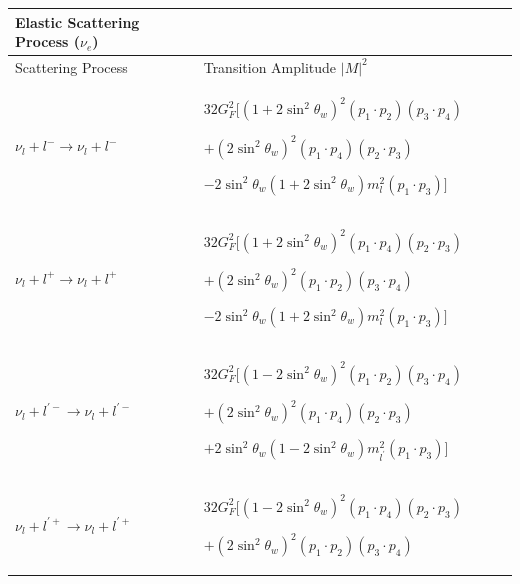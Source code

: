 \begin{table}[h]
\centering
\begin{tabular}{lp{8cm}lp{8cm}l}
\hline\hline
Elastic Scattering Process ($\nu_e$) \\
\hline\hline
Scattering Process & Transition Amplitude $|M|^2$\\
\hline
$\nu_l+l^-\longrightarrow\nu_l+l^-$ & 
$ 32G^2_F\bigg[
   \left(1+2\sin^2\theta_w\right)^2\left(p_1\cdot p_2\right)\left(p_3\cdot p_4\right)$
   
   $+\left(2\sin^2\theta_w\right)^2\left(p_1\cdot p_4\right)\left(p_2\cdot p_3\right)$
   
   $-2\sin^2\theta_w\left(1+2\sin^2\theta_w\right)m^2_l\left(p_1\cdot p_3\right)\bigg]$ \\
\hline
$\nu_l+l^+\longrightarrow\nu_l+l^+$ &
$ 32G^2_F\bigg[
   \left(1+2\sin^2\theta_w\right)^2\left(p_1\cdot p_4\right)\left(p_2\cdot p_3\right)$
   
   $+\left(2\sin^2\theta_w\right)^2\left(p_1\cdot p_2\right)\left(p_3\cdot p_4\right)$
   
   $-2\sin^2\theta_w\left(1+2\sin^2\theta_w\right)m^2_l\left(p_1\cdot p_3\right)\bigg]$ \\
\hline
$\nu_l+l^{\prime-}\longrightarrow\nu_l+l^{\prime-}$ &
$ 32G^2_F\bigg[
   \left(1-2\sin^2\theta_w\right)^2\left(p_1\cdot p_2\right)\left(p_3\cdot p_4\right)$
   
  $+\left(2\sin^2\theta_w\right)^2\left(p_1\cdot p_4\right)\left(p_2\cdot p_3\right)$
  
  $+2\sin^2\theta_w\left(1-2\sin^2\theta_w\right)m^2_{l^\prime}\left(p_1\cdot p_3\right)\bigg]$ \\
\hline
$\nu_l+l^{\prime+}\longrightarrow\nu_l+l^{\prime+}$ &
$ 32G^2_F\bigg[
   \left(1-2\sin^2\theta_w\right)^2\left(p_1\cdot p_4\right)\left(p_2\cdot p_3\right)$
   
   $+\left(2\sin^2\theta_w\right)^2\left(p_1\cdot p_2\right)\left(p_3\cdot p_4\right)$
   

\end{tabular}
\end{table}
